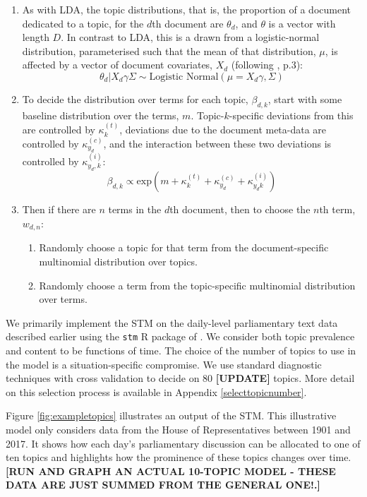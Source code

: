\documentclass[12pt,]{article}
\providecommand{\tightlist}{%
\setlength{\itemsep}{0pt}\setlength{\parskip}{0pt}}
\theoremstyle{definition}
\theoremstyle{definition}
\theoremstyle{definition}
\theoremstyle{remark}
\begin{document}
\begin{enumerate}
\def\labelenumi{\arabic{enumi}.}
\item
  As with LDA, the topic distributions, that is, the proportion of a
  document dedicated to a topic, for the \(d\)th document are
  \(\theta_d\), and \(\theta\) is a vector with length \(D\). In
  contrast to LDA, this is a drawn from a logistic-normal distribution,
  parameterised such that the mean of that distribution, \(\mu\), is
  affected by a vector of document covariates, \(X_d\) (following
  \citet{RobertsStewartTingley2018}, p.3):
  \[\theta_d|X_d\gamma\Sigma \sim \mbox{Logistic Normal}(\mu = X_d\gamma, \Sigma)\]
\item
  To decide the distribution over terms for each topic, \(\beta_{d,k}\),
  start with some baseline distribution over the terms, \(m\).
  Topic-\(k\)-specific deviations from this are controlled by
  \(\kappa_k^{(t)}\), deviations due to the document meta-data are
  controlled by \(\kappa_{y_d}^{(c)}\), and the interaction between
  these two deviations is controlled by \(\kappa_{y_d,k}^{(i)}\):
  \[\beta_{d,k}\propto \mbox{exp}\left(m+\kappa^{(t)}_{k} + \kappa_{y_d}^{(c)} + \kappa_{y_{d}k}^{(i)}\right) \]
\item
  Then if there are \(n\) terms in the \(d\)th document, then to choose
  the \(n\)th term, \(w_{d,n}\):

  \begin{enumerate}
  \def\labelenumii{\alph{enumii}.}
  \tightlist
  \item
    Randomly choose a topic for that term from the document-specific
    multinomial distribution over topics.
  \item
    Randomly choose a term from the topic-specific multinomial
    distribution over terms.
  \end{enumerate}
\end{enumerate}

We primarily implement the STM on the daily-level parliamentary text
data described earlier using the \texttt{stm} R package of
\citet{RobertsStewartAiroldiRPackage}. We consider both topic prevalence
and content to be functions of time. The choice of the number of topics
to use in the model is a situation-specific compromise. We use standard
diagnostic techniques with cross validation to decide on 80
\textbf{{[}UPDATE{]}} topics. More detail on this selection process is
available in Appendix \ref{selecttopicnumber}.

Figure \ref{fig:exampletopics} illustrates an output of the STM. This
illustrative model only considers data from the House of Representatives
between 1901 and 2017. It shows how each day's parliamentary discussion
can be allocated to one of ten topics and highlights how the prominence
of these topics changes over time. \textbf{{[}RUN AND GRAPH AN ACTUAL
10-TOPIC MODEL - THESE DATA ARE JUST SUMMED FROM THE GENERAL ONE!.{]}}
\end{document}
